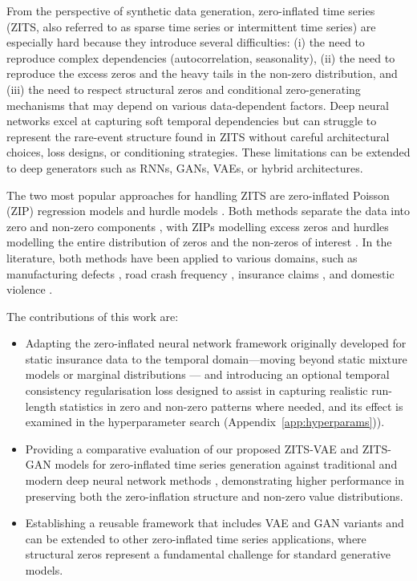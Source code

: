 \documentclass[make,article,submit,moreauthors]{Definitions/mdpi}
\begin{document}
From the perspective of synthetic data generation, zero-inflated time series (ZITS, also referred to as sparse time series or intermittent time series) are especially hard because they introduce several difficulties: (i) the need to reproduce complex dependencies (autocorrelation, seasonality), (ii) the need to reproduce the excess zeros and the heavy tails in the non-zero distribution, and (iii) the need to respect structural zeros and conditional zero-generating mechanisms that may depend on various data-dependent factors. Deep neural networks excel at capturing soft temporal dependencies but can struggle to represent the rare-event structure found in ZITS \cite{ref14,ref15,ref16,ref17} without careful architectural choices, loss designs, or conditioning strategies. These limitations can be extended to deep generators such as  RNNs, GANs, VAEs, or hybrid architectures.

The two most popular approaches for handling ZITS are zero-inflated Poisson (ZIP) regression models \cite{ref9,ref19} and hurdle models \cite{ref19,ref20}. Both methods separate the data into zero and non-zero components \cite{ref19}, with ZIPs modelling excess zeros and hurdles modelling the entire distribution of zeros and the non-zeros of interest \cite{ref19}. In the literature, both methods have been applied to various domains, such as manufacturing defects \cite{ref9}, road crash frequency \cite{ref5}, insurance claims \cite{ref21}, and domestic violence \cite{ref22}.

The contributions of this work are:
\begin{itemize}
    \item Adapting the zero-inflated neural network framework \cite{ref19} originally developed for static insurance data to the temporal domain—moving beyond static mixture models or marginal distributions — and introducing an optional temporal consistency regularisation loss designed to assist in capturing realistic run-length statistics in zero and non-zero patterns where needed, and its effect is examined in the hyperparameter search (Appendix~\ref{app:hyperparams})).
    \item Providing a comparative evaluation of our proposed ZITS-VAE and ZITS-GAN models for zero-inflated time series generation against traditional and modern deep neural network methods \cite{ref2,ref23,ref4,ref29}, demonstrating higher performance in preserving both the zero-inflation structure and non-zero value distributions.
    \item Establishing a reusable framework that includes VAE and GAN variants and can be extended to other zero-inflated time series applications, where structural zeros represent a fundamental challenge for standard generative models.
\end{itemize}
\end{document}
